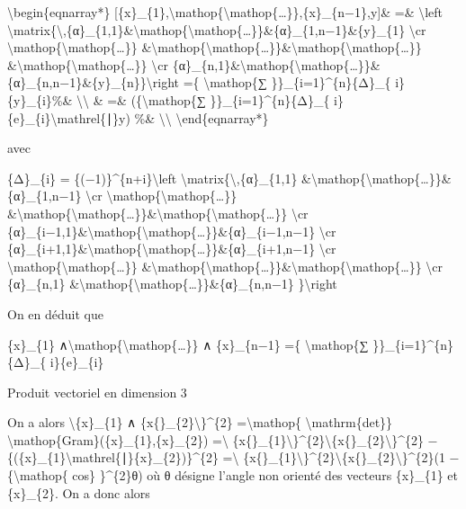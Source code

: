 \documentclass[]{article}
\begin{document}
\textbackslash{}begin\{eqnarray*\}
{[}\{x\}\_\{1\},\textbackslash{}mathop\{\textbackslash{}mathop\{\ldots{}\}\},\{x\}\_\{n−1\},y{]}\&
=\& \textbackslash{}left
\textbar{}\textbackslash{}matrix\{\textbackslash{},\{α\}\_\{1,1\}\&\textbackslash{}mathop\{\textbackslash{}mathop\{\ldots{}\}\}\&\{α\}\_\{1,n−1\}\&\{y\}\_\{1\}
\textbackslash{}cr
\textbackslash{}mathop\{\textbackslash{}mathop\{\ldots{}\}\}
\&\textbackslash{}mathop\{\textbackslash{}mathop\{\ldots{}\}\}\&\textbackslash{}mathop\{\textbackslash{}mathop\{\ldots{}\}\}
\&\textbackslash{}mathop\{\textbackslash{}mathop\{\ldots{}\}\}
\textbackslash{}cr
\{α\}\_\{n,1\}\&\textbackslash{}mathop\{\textbackslash{}mathop\{\ldots{}\}\}\&\{α\}\_\{n,n−1\}\&\{y\}\_\{n\}\}\textbackslash{}right
\textbar{} =\{ \textbackslash{}mathop\{∑ \}\}\_\{i=1\}\^{}\{n\}\{Δ\}\_\{
i\}\{y\}\_\{i\}\%\& \textbackslash{}\textbackslash{} \& =\&
(\{\textbackslash{}mathop\{∑ \}\}\_\{i=1\}\^{}\{n\}\{Δ\}\_\{
i\}\{e\}\_\{i\}\textbackslash{}mathrel\{∣\}y) \%\&
\textbackslash{}\textbackslash{} \textbackslash{}end\{eqnarray*\}

avec

\{Δ\}\_\{i\} = \{(−1)\}\^{}\{n+i\}\textbackslash{}left
\textbar{}\textbackslash{}matrix\{\textbackslash{},\{α\}\_\{1,1\}
\&\textbackslash{}mathop\{\textbackslash{}mathop\{\ldots{}\}\}\&\{α\}\_\{1,n−1\}
\textbackslash{}cr
\textbackslash{}mathop\{\textbackslash{}mathop\{\ldots{}\}\}
\&\textbackslash{}mathop\{\textbackslash{}mathop\{\ldots{}\}\}\&\textbackslash{}mathop\{\textbackslash{}mathop\{\ldots{}\}\}
\textbackslash{}cr
\{α\}\_\{i−1,1\}\&\textbackslash{}mathop\{\textbackslash{}mathop\{\ldots{}\}\}\&\{α\}\_\{i−1,n−1\}
\textbackslash{}cr
\{α\}\_\{i+1,1\}\&\textbackslash{}mathop\{\textbackslash{}mathop\{\ldots{}\}\}\&\{α\}\_\{i+1,n−1\}
\textbackslash{}cr
\textbackslash{}mathop\{\textbackslash{}mathop\{\ldots{}\}\}
\&\textbackslash{}mathop\{\textbackslash{}mathop\{\ldots{}\}\}\&\textbackslash{}mathop\{\textbackslash{}mathop\{\ldots{}\}\}
\textbackslash{}cr \{α\}\_\{n,1\}
\&\textbackslash{}mathop\{\textbackslash{}mathop\{\ldots{}\}\}\&\{α\}\_\{n,n−1\}
\}\textbackslash{}right \textbar{}

On en déduit que

\{x\}\_\{1\}
∧\textbackslash{}mathop\{\textbackslash{}mathop\{\ldots{}\}\} ∧
\{x\}\_\{n−1\} =\{ \textbackslash{}mathop\{∑
\}\}\_\{i=1\}\^{}\{n\}\{Δ\}\_\{ i\}\{e\}\_\{i\}

Produit vectoriel en dimension 3

On a alors \textbackslash{}\textbar{}\{x\}\_\{1\} ∧
\{x\{\}\_\{2\}\textbackslash{}\textbar{}\}\^{}\{2\}
=\textbackslash{}mathop\{ \textbackslash{}mathrm\{det\}\}
\textbackslash{}mathop\{Gram\}(\{x\}\_\{1\},\{x\}\_\{2\})
=\textbackslash{}\textbar{}
\{x\{\}\_\{1\}\textbackslash{}\textbar{}\}\^{}\{2\}\textbackslash{}\textbar{}\{x\{\}\_\{2\}\textbackslash{}\textbar{}\}\^{}\{2\}
− \{(\{x\}\_\{1\}\textbackslash{}mathrel\{∣\}\{x\}\_\{2\})\}\^{}\{2\}
=\textbackslash{}\textbar{}
\{x\{\}\_\{1\}\textbackslash{}\textbar{}\}\^{}\{2\}\textbackslash{}\textbar{}\{x\{\}\_\{2\}\textbackslash{}\textbar{}\}\^{}\{2\}(1
−\{\textbackslash{}mathop\{ cos\} \}\^{}\{2\}θ) où θ désigne l'angle non
orienté des vecteurs \{x\}\_\{1\} et \{x\}\_\{2\}. On a donc alors
\end{document}
